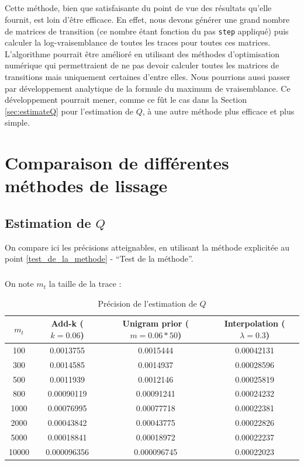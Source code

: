 \documentclass[a4paper,titlepage]{report}
\begin{document}
\paragraph{}
\paragraph{}
Cette méthode, bien que satisfaisante du point de vue des résultats qu'elle fournit, est loin d'être efficace. En effet, nous devons générer une grand nombre de matrices de transition (ce nombre étant fonction du pas \texttt{step} appliqué) puis calculer la log-vraisemblance de toutes les traces pour toutes ces matrices. L'algorithme pourrait être amélioré en utilisant des méthodes d'optimisation numérique qui permettraient de ne pas devoir calculer toutes les matrices de transitions mais uniquement certaines d'entre elles. Nous pourrions aussi passer par développement analytique de la formule du maximum de vraisemblance. Ce développement pourrait mener, comme ce fût le cas dans la Section \ref{sec:estimateQ} pour l'estimation de $Q$, à une autre méthode plus efficace et plus simple.
\appendix

\chapter{Comparaison de différentes méthodes de lissage}

\section{Estimation de $Q$}
On compare ici les précisions atteignables, en utilisant la méthode explicitée au point \ref{test_de_la_methode} - ``Test de la méthode''.
\paragraph{}
On note $m_t$ la taille de la trace :
\begin{table}[h]
	\center
	\begin{tabular}{c|ccc}
	$m_t$ & Add-k ($k = 0.06$) & Unigram prior ($m = 0.06 * 50$) & Interpolation ($\lambda = 0.3$)\\
	\hline
	100 & \num{0.0013755} & \num{0.0015444} & \num{0.00042131}\\
	300 & \num{0.0014585} & \num{0.0014937} & \num{0.00028596}\\
	500 & \num{0.0011939} & \num{0.0012146} & \num{0.00025819}\\
	800 & \num{0.00090119} & \num{0.00091241} & \num{0.00024232}\\
	1000 & \num{0.00076995} & \num{0.00077718} & \num{0.00022381}\\
	2000 & \num{0.00043842} & \num{0.00043775} & \num{0.00022826}\\
	5000 & \num{0.00018841} & \num{0.00018972} & \num{0.00022237}\\	
	10000 & \num{0.000096356} & \num{0.000096745} & \num{0.00022023}\\	
	\end{tabular}
	\caption{Précision de l'estimation de $Q$}
	\label{tab:}
\end{table}
\end{document}
